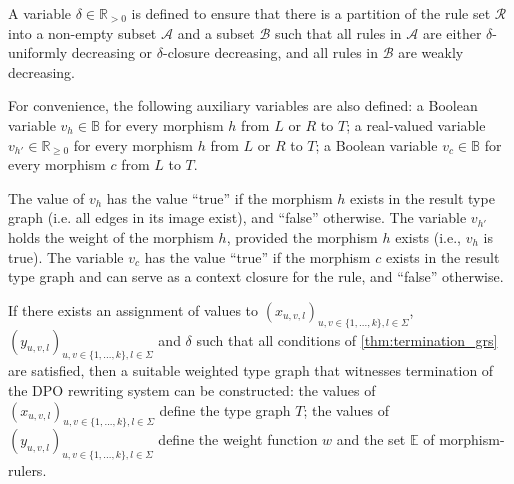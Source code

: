 A variable $\delta \in \mathbb{R}_{>0}$ is defined to ensure that there is
a partition of the rule set $\mathcal{R}$ into a non-empty subset $\mathcal{A}$ and a subset $\mathcal{B}$ such that all rules in $\mathcal{A}$ are either $\delta$-uniformly decreasing or $\delta$-closure decreasing, and all rules in $\mathcal{B}$ are weakly decreasing.

For convenience, the following auxiliary variables are also defined: a Boolean variable $v_h \in \mathbb{B}$ for every morphism $h$ from $L$ or $R$ to $T$; a real-valued variable $v_{h'} \in \mathbb{R}_{\geq 0}$ for every morphism $h$ from $L$ or $R$ to $T$; a Boolean variable $v_c \in \mathbb{B}$ for every morphism $c$ from $L$ to $T$.

The value of $v_h$ has the value \enquote{true} if the morphism $h$ exists in the result type graph (i.e. all edges in its image exist), and \enquote{false} otherwise.
The variable $v_{h'}$ holds the weight of the morphism $h$, provided the morphism $h$ exists (i.e., $v_h$ is true).
The variable $v_c$ has the value \enquote{true} if the morphism $c$ exists in the result type graph and can serve as a context closure for the rule, and \enquote{false} otherwise.

If there exists an assignment of values to \( (x_{u,v,l})_{u,v \in \{1,...,k\}, l \in \Sigma} \), \( (y_{u,v,l})_{u,v \in \{1,...,k\}, l \in \Sigma} \) and $\delta$ such that all conditions of \autoref{thm:termination_grs} are satisfied, then a suitable weighted type graph that witnesses termination of the DPO rewriting system can be constructed: the values of \( (x_{u,v,l})_{u,v \in \{1,...,k\}, l \in \Sigma} \) define the type graph $T$; the values of \( (y_{u,v,l})_{u,v \in \{1,...,k\}, l \in \Sigma} \) define the weight function $w$ and the set $\mathbb{E}$ of morphism-rulers.     